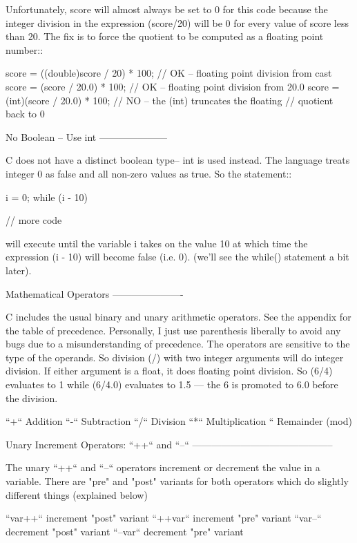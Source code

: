 Unfortunately, score will almost always be set to 0 for this code because the integer division in the expression (score/20) will be 0 for every value of score less than 20. The fix is to force the quotient to be computed as a floating point number::

    score = ((double)score / 20) * 100; // OK -- floating point division from cast
    score = (score / 20.0) * 100;  // OK -- floating point division from 20.0
    score = (int)(score / 20.0) * 100; // NO -- the (int) truncates the floating
                                       // quotient back to 0

No Boolean -- Use int
---------------------

C does not have a distinct boolean type-- int is used instead. The language treats integer 0 as false and all non-zero values as true. So the statement::

    i = 0;
    while (i - 10) {
        // more code

    }

will execute until the variable i takes on the value 10 at which time the expression (i - 10) will become false (i.e. 0). (we'll see the while() statement a bit later).

Mathematical Operators
----------------------

C includes the usual binary and unary arithmetic operators. See the appendix for the table of precedence. Personally, I just use parenthesis liberally to avoid any bugs due to a misunderstanding of precedence. The operators are sensitive to the type of the operands. So division (/) with two integer arguments will do integer division. If either argument is a float, it does floating point division. So (6/4) evaluates to 1 while (6/4.0) evaluates to 1.5 --- the 6 is promoted to 6.0 before the division.

``+``
    Addition
``-``
    Subtraction
``/``
    Division
``*``
    Multiplication
``%
    Remainder (mod)

Unary Increment Operators: ``++`` and ``--``
--------------------------------------------

The unary ``++`` and ``--`` operators increment or decrement the value in a variable. There are "pre" and "post" variants for both operators which do slightly different things (explained below)

``var++``
    increment "post" variant 
``++var``
    increment "pre" variant
``var--``
    decrement "post" variant 
``--var``
    decrement "pre" variant

